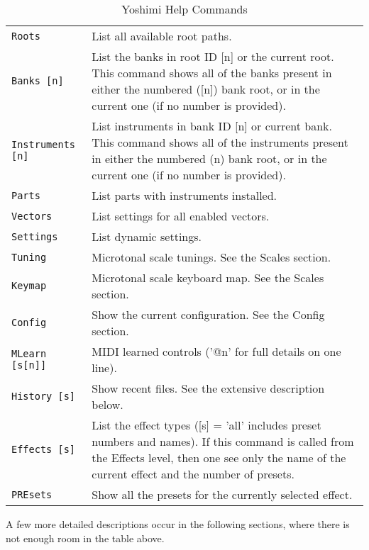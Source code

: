 \begin{center}
\begin{longtable}{p{4cm} p{10cm}}
\caption[Yoshimi Help Commands]{Yoshimi Help Commands} \\

\texttt{Roots} &
   List all available root paths. \\
\texttt{Banks [n]} &
   List the banks in root ID [n] or the current root.
   This command shows all of the banks present in either the numbered ([n])
   bank root, or in the current one (if no number is provided).  \\
\texttt{Instruments [n]} &
   List instruments in bank ID [n] or current bank.
   This command shows all of the instruments present in either the numbered
   (n) bank root, or in the current one (if no number is provided).  \\
\texttt{Parts} &
   List parts with instruments installed. \\
\texttt{Vectors} &
   List settings for all enabled vectors. \\
\texttt{Settings} &
   List dynamic settings. \\
\texttt{Tuning} &
   Microtonal scale tunings. See the Scales section. \\
\texttt{Keymap} &
   Microtonal scale keyboard map.  See the Scales section. \\
\texttt{Config} &
   Show the current configuration. See the Config section. \\
\texttt{MLearn [s[n]]} &
   MIDI learned controls ('@n' for full details on one line). \\
\texttt{History [s]} &
   Show recent files. See the extensive description below. \\
\texttt{Effects [s]} &
   List the effect types ([s] = 'all' includes preset numbers and names).
   If this command is called from the Effects level, then one see only the name
   of the current effect and the number of presets. \\
\texttt{PREsets} &
   Show all the presets for the currently selected effect. \\

\end{longtable}
\end{center}


A few more detailed descriptions occur in the following sections, where there
is not enough room in the table above.

